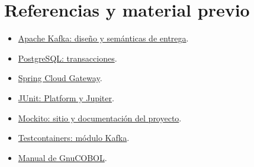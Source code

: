 \section{Referencias y material previo}
\begin{itemize}
\item \href{https://kafka.apache.org/41/design/design/}{Apache Kafka: diseño y semánticas de entrega}.
\item \href{https://www.postgresql.org/docs/current/tutorial-transactions.html}{PostgreSQL: transacciones}.
\item \href{https://docs.spring.io/spring-cloud-gateway/reference/}{Spring Cloud Gateway}.
\item \href{https://docs.junit.org/6.1.3/overview.html}{JUnit: Platform y Jupiter}.
\item \href{https://site.mockito.org/}{Mockito: sitio y documentación del proyecto}.
\item \href{https://java.testcontainers.org/modules/kafka/}{Testcontainers: módulo Kafka}.
\item \href{https://gnucobol.sourceforge.io/doc/gnucobol.html}{Manual de GnuCOBOL}.
\end{itemize}


